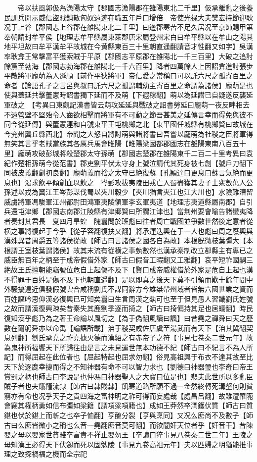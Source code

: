 　　帝以扶風郭伋為漁陽太守【郡國志漁陽郡在雒陽東北二千里】伋承離亂之後養民訓兵開示威信盜賊銷散匈奴遠迹在職五年戶口增倍　帝使光禄大夫樊宏持節迎耿况于上谷【郡國志上谷郡在雒陽東北二千里】曰邊郡寒苦不足久居况至京師賜甲第奉朝請封牟平侯【地理志牟平縣屬東萊郡唐宋屬登州宋白曰牟平縣以在牟山之陽其地平坦故曰牟平漢牟平故城在今黄縣東百三十里朝直遥翻請音才性翻又如字】吳漢率耿弇王常擊富平獲索賊于平原【郡國志平原郡在雒陽北一千三百里】大破之追討餘黨至勃海【郡國志勃海郡在雒陽北一千六百里】降者四萬餘人上因詔弇進討張步　平敵將軍龐萌為人遜順【前作平狄將軍】帝信愛之常稱曰可以託六尺之孤寄百里之命者【論語孔子之言呂與叔曰託六尺之孤謂輔幼主寄百里之命謂為諸侯】龐萌是也使與蓋延共擊董憲時詔書獨下延而不及萌【下遐稼翻】萌以為延譛已自疑遂反襲延軍破之　【考異曰東觀記漢書皆云萌攻延延與戰破之詔書勞延曰龐萌一夜反畔相去不遠營壁不堅殆令人齒欲相擊而將軍有不可動之節吾甚美之延傳言幸而得免與彼不同今從延傳】與董憲連和自號東平王屯桃鄉之北【東平國任城縣有桃鄉賢曰故城在今兖州龔丘縣西北】帝聞之大怒自將討萌與諸將書曰吾嘗以龐萌為社稷之臣將軍得無笑其言乎老賊當族其各厲兵馬會睢陽【睢陽梁國都郡國志在雒陽東南八百五十里】龐萌攻破彭城將殺楚郡太守孫萌【郡國志楚郡在雒陽東千二百二十里考異曰袁紀作楚相孫萌今從范書】郡吏劉平伏太守身上號泣請代其死身被七創【號戶刀翻下同被皮義翻創初良翻】龐萌義而捨之太守已絶復蘇【孔頴達曰更息曰蘇言氣絶而更息也】渇求飲平傾創血以飲之　岑彭攻拔夷陵田戎亡入蜀盡獲其妻子士衆數萬人公孫述以戎為翼江王岑彭謀伐蜀以夾川穀少【夾川猶言夾江也江大川也】水險難漕留威虜將軍馮駿軍江州都尉田鴻軍夷陵領軍李玄軍夷道【地理志夷道縣屬南郡】自引兵還屯津鄉【郡國志南郡江陵縣有津郷賢曰所謂江津也】當荆州要會喻告諸蠻夷降者奏封其君長　夏四月旱蝗　隗囂問於班彪曰往者周亡戰國並爭數世然後定意者從横之事將復起于今乎【從子容翻復扶又翻】將承運迭興在于一人也彪曰周之廢興與漢殊異昔周爵五等諸侯從政【師古曰言諸侯之國各自為政】本根旣微枝葉彊大【本根謂王室枝葉謂諸侯】故其末流有從横之事埶數然也漢承秦制改立郡縣主有專已之威臣無百年之柄至于成帝假借外家【師古曰假音工暇翻又工雅翻】哀平短祚國嗣三絶故王氏擅朝能竊號位危自上起傷不及下【賢口成帝威權借於外家是危自上起也漢不得罪于百姓是傷不及下也朝直遥翻】是以即真之後天下莫不引領而歎十餘年間中外騷擾遠近俱發假號雲合咸稱劉氏不謀同辭方今雄桀帶州域者皆無六國世業之資而百姓謳吟思仰漢必復興已可知矣囂曰生言周漢之埶可也至于但見愚人習識劉氏姓號之故而謂漢復興疎矣昔秦失其鹿劉季逐而掎之【師古曰掎偏持其足也居蟻翻】時民復知漢乎彪乃為之著王命論以風切之【為于偽翻風讀曰諷】曰昔堯之禪舜曰天之歷數在爾躬舜亦以命禹【論語所載】洎于稷契咸佐唐虞至湯武而有天下【洎其冀翻契息列翻】劉氏承堯之祚堯據火德而漢紹之有赤帝子之符【事見七卷秦二世元年】故為鬼神所福饗天下所歸往由是言之未見運世無本功德不紀【師古曰不紀言不為人所記】而得屈起在此位者也【屈起特起也屈求勿翻】俗見高祖興于布衣不達其故至比天下於逐鹿幸捷而得之不知神器有命不可以智力求也【劉德曰神器璽也李奇曰帝王賞罰之柄也師古曰李說是也仲馮曰神器聖人之大寶曰位是也】悲夫此世所以多亂臣賊子者也夫餓饉流隸【師古曰隷賤隸】飢寒道路所願不過一金然終轉死溝壑何則貧窮亦有命也况乎天子之貴四海之富神明之祚可得而妄處哉【處昌呂翻】故雖遭罹阨會竊其權柄勇如信布彊如梁籍【謂項梁項籍也】成如王莽然卒潤鑊伏質【師古曰質鍖也伏於鍖上而斬之也卒子恤翻】亨醢分裂【亨與烹同】又况么麽尚不及數子【師古曰么麽皆微小之稱也么音一堯翻麽音莫可翻】而欲闇奸天位者乎【奸音干】昔陳嬰之母以嬰家世貧賤卒富貴不祥止嬰勿王【卒讀曰猝事見八卷秦二世二年】王陵之母知漢王必得天下伏劔而死以固勉陵【事見九卷高祖元年】夫以匹婦之明猶能推事理之致探禍福之機而全宗祀